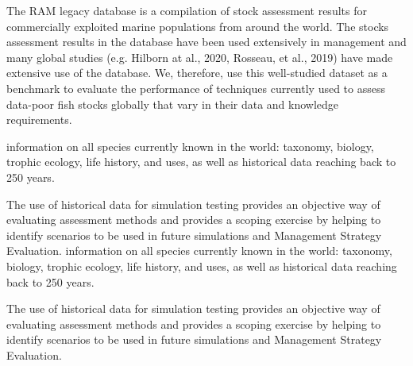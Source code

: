 The RAM legacy database is a compilation of stock assessment results for commercially exploited marine populations from around the world. The stocks assessment results in the database have been used extensively in management and many global studies (e.g. Hilborn at al., 2020, Rosseau, et al., 2019) have made extensive use of the database. We, therefore, use this well-studied dataset as a benchmark to evaluate the performance of techniques currently used to assess data-poor fish stocks globally that vary in their data and knowledge requirements.

information on all species currently known in the world: taxonomy, biology, trophic ecology, life history, and uses, as well as historical data reaching back to 250 years.

The use of historical data for simulation testing provides an objective way of evaluating assessment methods and provides a scoping exercise by helping to identify scenarios to be used in future simulations and Management Strategy Evaluation. information on all species currently known in the world: taxonomy, biology, trophic ecology, life history, and uses, as well as historical data reaching back to 250 years.

The use of historical data for simulation testing provides an objective way of evaluating assessment methods and provides a scoping exercise by helping to identify scenarios to be used in future simulations and Management Strategy Evaluation.
\fi

